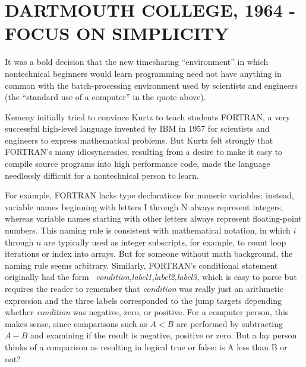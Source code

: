 
\section{DARTMOUTH COLLEGE, 1964 - FOCUS ON SIMPLICITY}


It was a bold decision that the new timesharing
``environment'' in which nontechnical beginners would learn programming need not have
anything in common with the batch-processing environment used by
scientists and engineers (the ``standard use of a computer'' in the
quote above). 

Kemeny initially tried to convince Kurtz to teach students FORTRAN, a
very successful high-level language invented by IBM in 1957 for
scientists and engineers to express mathematical problems.
But Kurtz felt strongly that FORTRAN's many idiosyncrasies, resulting
from a desire to make it easy to compile source programs into
high performance code, made the language needlessly difficult for a
nontechnical person to learn.

\begin{tangent} For example, FORTRAN lacks type declarations for numeric
  variables: instead,
  variable names beginning with letters I through N always represent
  integers, whereas variable names starting with other letters always
  represent floating-point numbers.
This naming rule is consistent with mathematical notation, in which
$i$ through $n$ are typically used as integer subscripts, for example,
to count loop iterations or index into arrays.
But for someone without math background, the naming rule seems arbitrary.
Similarly, FORTRAN's conditional statement originally had the form
~\emph{condition,label1,label2,label3}, which is easy 
to parse but requires the reader to remember that \emph{condition} was
really just an arithmetic expression and the three labels 
corresponded to the jump targets depending whether
\emph{condition} was negative, zero, or positive.  For a computer
person, this makes sense, since comparisons such as $A<B$ are performed 
by subtracting $A-B$ and examining if the result is negative, positive
or zero.
But a lay person thinks of a comparison as resulting in logical true or
false: is A less than B or not?
\end{tangent}

